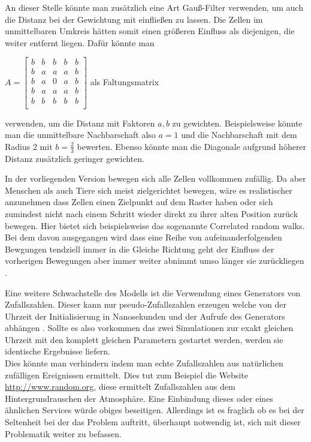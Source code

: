\documentclass[10pt,twocolumn]{scrartcl}
\begin{document}
An dieser Stelle könnte man zusätzlich eine Art Gauß-Filter verwenden, um auch die Distanz bei der Gewichtung mit einfließen zu lassen. Die Zellen im unmittelbaren Umkreis hätten somit einen größeren Einfluss als diejenigen, die weiter entfernt liegen.
Dafür könnte man 
\begin{center}
 $A = 
\begin{bmatrix}
b & b & b & b & b \\
b & a & a & a & b \\
b & a & 0 & a & b \\
b & a & a & a & b \\
b & b & b & b & b \\
\end{bmatrix}
$ als Faltungsmatrix
\end{center} 

verwenden, um die Distanz mit Faktoren $a,b$ zu gewichten. Beispielsweise könnte man die unmittelbare Nachbarschaft also $a=1$ und die Nachbarschaft mit dem Radius 2 mit $b=\frac{2}{3}$ bewerten. Ebenso könnte man die Diagonale aufgrund höherer Distanz zusätzlich geringer gewichten.

In der vorliegenden Version bewegen sich alle Zellen vollkommen zufällig. Da aber Menschen als auch Tiere sich meist zielgerichtet bewegen, wäre es realistischer anzunehmen dass Zellen einen Zielpunkt auf dem Raster haben oder sich zumindest nicht nach einem Schritt wieder direkt zu ihrer alten Position zurück bewegen. Hier bietet sich beispielsweise das sogenannte \glqq{}Correlated random walks\grqq{}. Bei dem davon ausgegangen wird dass eine Reihe von aufeinanderfolgenden Bewgungen tendziell immer in die Gleiche Richtung geht der Einfluss der vorherigen Bewegungen aber immer weiter abnimmt umso länger sie zurückliegen \cite{Codling:2008}.

Eine weitere Schwachstelle des Modells ist die Verwendung eines Generators von Zufallszahlen. Dieser kann nur pseudo-Zufallszahlen erzeugen welche von der Uhrzeit der Initialisierung in Nanosekunden und der Aufrufe des Generators abhängen \cite{Oracle:2014}. Sollte es also vorkommen das zwei Simulationen zur exakt gleichen Uhrzeit mit den komplett gleichen Parametern gestartet werden, werden sie identische Ergebnisse liefern.\\
Dies könnte man verhindern indem man echte Zufallszahlen aus natürlichen zufälligen Ereignissen ermittelt. Dies tut zum Beispiel die Website \url{http://www.random.org}, diese ermittelt Zufallszahlen aus dem Hintergrundrauschen der Atmosphäre. Eine Einbindung dieses oder eines ähnlichen Services würde obiges beseitigen. Allerdings ist es fraglich ob es bei der Seltenheit bei der das Problem auftritt, überhaupt notwendig ist, sich mit dieser Problematik weiter zu befassen.
\end{document}
